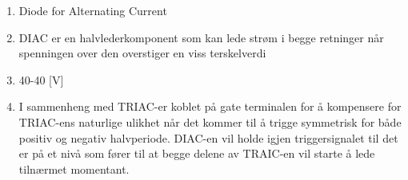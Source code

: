 \begin{solution}[name=Løsningsforslag]
	\begin{enumerate}[label=\roman*)]
	\item Diode for Alternating Current
	\item DIAC er en halvlederkomponent som kan lede strøm i begge retninger når spenningen over den overstiger en viss terskelverdi
	\item 40-40 [V]
	\item I sammenheng med TRIAC-er koblet på gate terminalen for å kompensere for TRIAC-ens naturlige ulikhet når det kommer til å trigge symmetrisk for både positiv og negativ halvperiode. DIAC-en vil holde igjen triggersignalet til det er på et nivå som fører til at begge delene av TRAIC-en vil starte å lede tilnærmet momentant.
\end{enumerate}
\end{solution}

